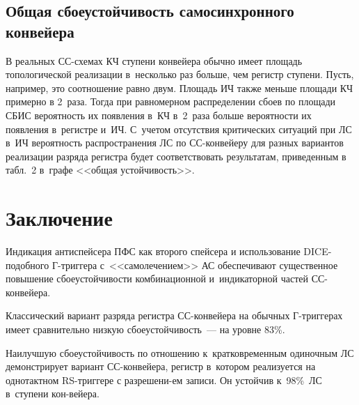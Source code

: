 \begin{multicols}{2}
\vspace*{-6pt}
  
\subsection{Общая сбоеустойчивость самосинхронного конвейера}

\vspace*{-2pt}

  В реальных СС-схемах КЧ ступени конвейера обычно имеет площадь 
топологической реализации в~несколько раз больше, чем регистр ступени. 
Пусть, например, это соотношение равно двум. Площадь ИЧ также меньше 
площади
КЧ примерно в 2~раза. Тогда при равномерном распределении сбоев по 
площади СБИС вероятность их появления в~КЧ в~2~раза больше вероятности 
их появления в~регистре и~ИЧ. С~учетом отсутствия критических ситуаций 
при ЛС в~ИЧ вероятность распространения ЛС по СС-конв\-ей\-еру для 
разных вариантов реализации разряда регистра будет соответствовать 
результатам, приведенным в табл.~2 в~графе <<общая устойчивость>>.

\vspace*{-6pt}

\section{Заключение}

\vspace*{-2pt}
  
  Индикация антиспейсера ПФС как второго спейсера и использование 
  DICE-по\-доб\-но\-го Г-триг\-ге\-ра с~<<самолечением>> АС 
обеспечивают существенное повышение сбоеустойчивости комбинационной 
и~индикаторной частей    СС-кон\-вей\-ера.
  
  Классический вариант разряда регистра СС-конвейера на обычных Г-триг\-ге\-рах имеет сравнительно низкую сбоеустойчивость~--- на уровне 83\%. 
  
  Наилучшую сбоеустойчивость по отношению к~кратковременным 
одиночным ЛС демонстрирует вариант СС-кон\-вей\-ера, регистр в~котором 
реализуется на однотактном 
  RS-триг\-ге\-ре с разрешени-\linebreak ем записи. Он устойчив к~98\%~ЛС в~ступени 
кон-\linebreak вейера. 

\vspace*{-8pt}

{\small\frenchspacing
 {%
 \begin{thebibliography}{9}
 

\end{thebibliography}}}
\end{multicols}
